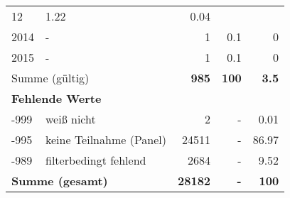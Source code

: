\begin{longtable}{lXrrr}
       \num{12} &
       \num[round-mode=places,round-precision=2]{1.22} &
         \num[round-mode=places,round-precision=2]{0.04} \\

     2014 &
     \multicolumn{1}{X}{ -  } &


       \num{1} &
       \num[round-mode=places,round-precision=2]{0.1} &
         \num[round-mode=places,round-precision=2]{0} \\

     2015 &
     \multicolumn{1}{X}{ -  } &


       \num{1} &
       \num[round-mode=places,round-precision=2]{0.1} &
         \num[round-mode=places,round-precision=2]{0} \\
     \midrule
     \multicolumn{2}{l}{Summe (gültig)} &
       \textbf{\num{985}} &
     \textbf{\num{100}} &
       \textbf{\num[round-mode=places,round-precision=2]{3.5}} \\
     \multicolumn{5}{l}{\textbf{Fehlende Werte}}\\
       -999 &
       weiß nicht &
         \num{2} &
        - &
         \num[round-mode=places,round-precision=2]{0.01} \\
       -995 &
       keine Teilnahme (Panel) &
         \num{24511} &
        - &
         \num[round-mode=places,round-precision=2]{86.97} \\
       -989 &
       filterbedingt fehlend &
         \num{2684} &
        - &
         \num[round-mode=places,round-precision=2]{9.52} \\
     \midrule
     \multicolumn{2}{l}{\textbf{Summe (gesamt)}} &
          \textbf{\num{28182}} &
        \textbf{-} &
        \textbf{\num{100}} \\
     \bottomrule
     \end{longtable}
     
